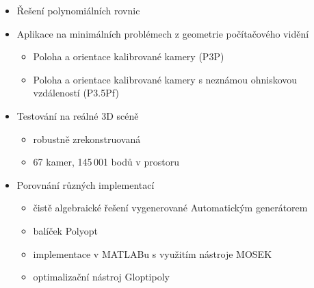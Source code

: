 \documentclass[cmpiitalkstyle, 22pt]{cmptalk}
\begin{document}
\begin{cmptalkslide}[Experimenty]
  \begin{itemize}
    \item Řešení polynomiálních rovnic
    \item Aplikace na minimálních problémech z geometrie počítačového vidění
    \begin{itemize}
      \item Poloha a orientace kalibrované kamery (P3P)
      \item Poloha a orientace kalibrované kamery s neznámou ohniskovou vzdáleností (P3.5Pf)
    \end{itemize}
    \item Testování na reálné 3D scéně
    \begin{itemize}
      \item robustně zrekonstruovaná
      \item 67 kamer, 145\,001 bodů v prostoru
    \end{itemize}
    \item Porovnání různých implementací
    \begin{itemize}
      \item čistě algebraické řešení vygenerované Automatickým generátorem \cite{AutoGen}
      \item balíček Polyopt
      \item implementace v MATLABu s využitím nástroje MOSEK \cite{mosek}
      \item optimalizační nástroj Gloptipoly \cite{gloptipoly}
    \end{itemize}
  \end{itemize}


\end{cmptalkslide}
\end{document}

